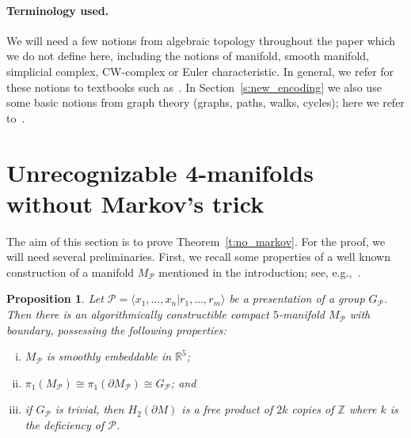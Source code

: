 \documentclass[10pt,a4paper]{article}
\newtheorem{proposition}[theorem]{Proposition}
\theoremstyle{definition}
\theoremstyle{remark}
\newcommand{\R}{{\mathbb{R}}}
\newcommand{\Z}{{\mathbb{Z}}}
\newcommand\PP{\mathcal{P}}
\begin{document}
\paragraph{Terminology used.} We will need a few notions from algebraic
topology throughout the paper which we do not define here, including the
notions of manifold, smooth manifold, simplicial complex, CW-complex or Euler characteristic. In
general, we refer for these notions to textbooks such as~\cite{hatcher02,
tomdieck08}. In Section~\ref{s:new_encoding} we also use some basic notions from
graph theory (graphs, paths, walks, cycles); here we refer to~\cite{diestel18}.

\section{Unrecognizable 4-manifolds without Markov's trick}
\label{s:no_markov}

The aim of this section is to prove Theorem~\ref{t:no_markov}.
For the proof,
we will need several preliminaries. First, we recall some properties of a well
known construction of a manifold $M_{\PP}$ mentioned in the introduction; see,
e.g.,~\cite{boone-haken-poenaru66}.

\begin{proposition}
\label{p:M}
Let $\PP = \langle x_1, \dots, x_n| r_1, \dots, r_m \rangle$ be a 
  presentation of a group $G_{\PP}$. Then there is an algorithmically
  constructible compact $5$-manifold $M_{\PP}$ with
  boundary, possessing the following properties:
  \begin{enumerate}[(i)]
    \item $M_{\PP}$ is smoothly embeddable in $\R^5$;
    \item $\pi_1(M_{\PP}) \cong  \pi_1(\partial  M_{\PP}) \cong G_{\PP}$; and
    \item if $G_{\PP}$ is trivial, then $H_2(\partial M)$ is a free product of $2k$
      copies of $\Z$ where $k$ is the deficiency of $\PP$.
\end{enumerate}
\end{proposition}
\end{document}
